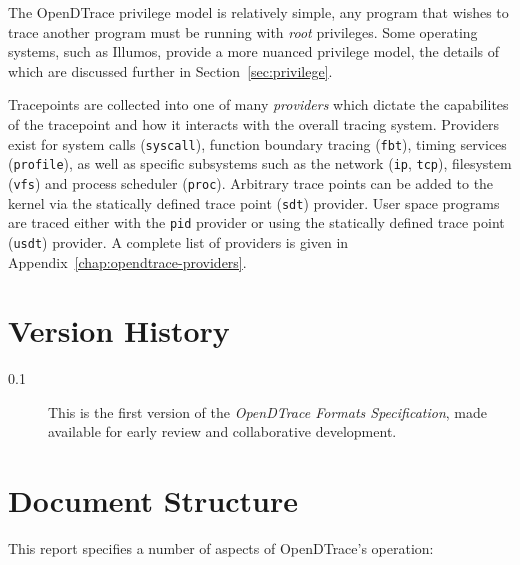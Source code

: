 The OpenDTrace privilege model is relatively simple, any program that
wishes to trace another program must be running with \emph{root}
privileges.  Some operating systems, such as Illumos, provide a more
nuanced privilege model, the details of which are discussed further in
Section~\ref{sec:privilege}.

Tracepoints are collected into one of many \emph{providers} which dictate
the capabilites of the tracepoint and how it interacts with the overall
tracing system.  Providers exist for system calls (\texttt{syscall}),
function boundary tracing (\texttt{fbt}), timing services (\texttt{profile}),
as well as specific subsystems such as the network (\texttt{ip}, \texttt{tcp}),
filesystem (\texttt{vfs}) and process scheduler (\texttt{proc}).
Arbitrary trace points can be added to the kernel via the
statically defined trace point (\texttt{sdt}) provider.  User space programs
are traced either with the \texttt{pid} provider or using the 
statically defined trace point (\texttt{usdt}) provider.  A complete
list of providers is given in Appendix~\ref{chap:opendtrace-providers}.

\section{Version History}

\begin{description}
\item[0.1] This is the first version of the \textit{OpenDTrace Formats
  Specification}, made available for early review and collaborative
  development.
\end{description}

\section{Document Structure}

This report specifies a number of aspects of OpenDTrace's operation:

